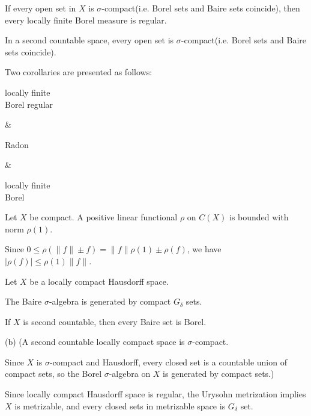 \documentclass{../../large}
\begin{document}
\begin{thm}
If every open set in $X$ is $\sigma$-compact(i.e. Borel sets and Baire sets coincide), then every locally finite Borel measure is regular.
\end{thm}
\begin{prop}
In a second countable space, every open set is $\sigma$-compact(i.e. Borel sets and Baire sets coincide).
\end{prop}


Two corollaries are presented as follows:
\begin{rd}[column sep={120pt,between origins}]
\parbox{7em}{\centering locally finite \\ Borel regular} \rar &
\parbox{5em}{\centering Radon} \rar {} &
\parbox{7em}{\centering locally finite \\ Borel} 
\end{rd}




\begin{prb}
Let $X$ be compact.
A positive linear functional $\rho$ on $C(X)$ is bounded with norm $\rho(1)$.
\end{prb}
\begin{pf}
Since $0\le\rho(\|f\|\pm f)=\|f\|\rho(1)\pm\rho(f)$, we have $|\rho(f)|\le\rho(1)\|f\|$.
\end{pf}

\begin{prb}
Let $X$ be a locally compact Hausdorff space.
\begin{parts}
\item The Baire $\sigma$-algebra is generated by compact $G_\delta$ sets.
\item If $X$ is second countable, then every Baire set is Borel.
\end{parts}
\end{prb}
\begin{sol}
(b)
(A second countable locally compact space is $\sigma$-compact.

Since $X$ is $\sigma$-compact and Hausdorff, every closed set is a countable union of compact sets, so the Borel $\sigma$-algebra on $X$ is generated by compact sets.)

Since locally compact Hausdorff space is regular, the Urysohn metrization implies $X$ is metrizable, and every closed sets in metrizable space is $G_\delta$ set.
\end{sol}
\end{document}
